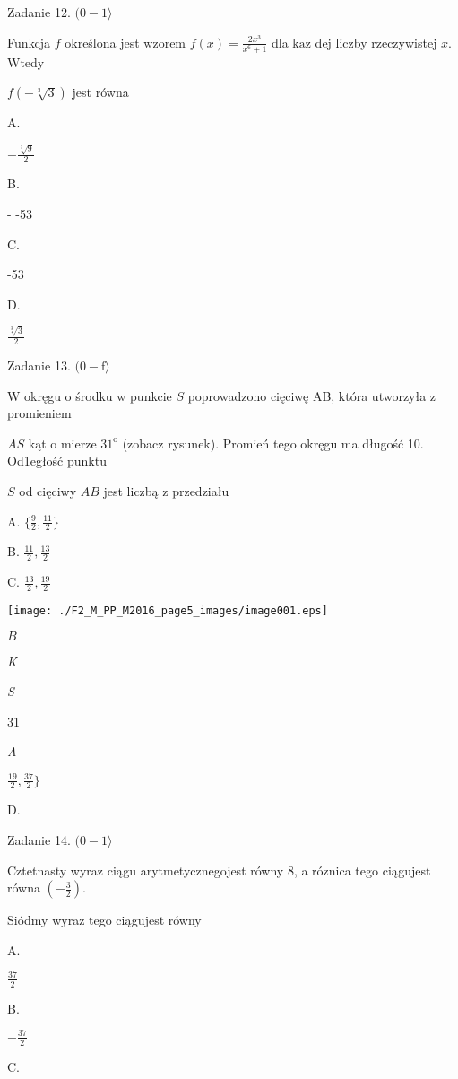 \documentclass[a4paper,12pt]{article}
\begin{document}
Zadanie 12. $(0-1\rangle$

Funkcja $f$ określona jest wzorem $f(x)=\displaystyle \frac{2x^{3}}{x^{6}+1}$ dla $\mathrm{k}\mathrm{a}\dot{\mathrm{z}}$ dej liczby rzeczywistej $x$. Wtedy

$f(-\sqrt[3]{3})$ jest równa

A.

$-\displaystyle \frac{\sqrt[3]{9}}{2}$

B.

- -53

C.

-53

D.

$\displaystyle \frac{\sqrt[3]{3}}{2}$

Zadanie 13. $(0-\mathrm{f}\rangle$

$\mathrm{W}$ okręgu o środku w punkcie $S$ poprowadzono cięciwę AB, która utworzyła z promieniem

$AS$ kąt o mierze $31^{\mathrm{o}}$ (zobacz rysunek). Promień tego okręgu ma długość 10. Od1egłość punktu

$S$ od cięciwy $AB$ jest liczbą z przedziału

A. $\displaystyle \{\frac{9}{2},\frac{11}{2}\}$

B. $\displaystyle \frac{11}{2}, \displaystyle \frac{13}{2}$

C. $\displaystyle \frac{13}{2}, \displaystyle \frac{19}{2}$
\begin{center}
\texttt{[image: ./F2\_M\_PP\_M2016\_page5\_images/image001.eps]}
\end{center}
$B$

{\it K}

{\it S}

31

{\it A}

$\displaystyle \frac{19}{2}, \displaystyle \frac{37}{2}\}$

D.

Zadanie 14. $(0-1\rangle$

Cztetnasty wyraz ciągu arytmetycznegojest równy 8, a róznica tego ciągujest równa $(-\displaystyle \frac{3}{2}).$

Siódmy wyraz tego ciągujest równy

A.

$\displaystyle \frac{37}{2}$

B.

$-\displaystyle \frac{37}{2}$

C.
\end{document}
